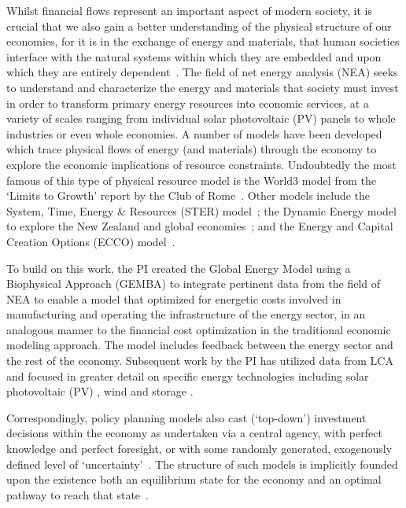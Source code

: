 \documentclass[11pt,a4paper]{article}
\begin{document}
Whilst financial flows represent an important aspect of modern society,
it is crucial that we also gain a better understanding of 
the physical structure of our economies,
for it is in the exchange of energy and materials,
that human societies interface with the natural systems
within which they are embedded and upon which 
they are entirely dependent~\cite{Heun2015, Dale2012a}.
The field of net energy analysis (NEA)
seeks to understand and characterize the 
energy and materials that society must invest
in order to transform primary energy resources into economic services,
at a variety of scales ranging from individual solar photovoltaic (PV) panels 
to whole industries or even whole economies.
A number of models have been developed 
which trace physical flows of energy (and materials) 
through the economy to explore 
the economic implications of resource constraints. 
Undoubtedly the most famous of this type of 
physical resource model is the World3 model from 
the `Limits to Growth' report by the Club of Rome~\cite{Meadows1972}. 
Other models include the System, Time, Energy \& Resources (STER) model~\cite{Hounam1979}; 
the Dynamic Energy model to explore the New Zealand  and global  economies~\cite{Baines1983, Bodger1989}; 
and the Energy and Capital Creation Options (ECCO) model~\cite{Slesser1992}.

To build on this work, the PI created 
the Global Energy Model using a Biophysical Approach (GEMBA) 
to integrate pertinent data from the field of NEA 
to enable a model that optimized for energetic costs involved in 
manufacturing and operating the infrastructure of the energy sector, 
in an analogous manner to the financial cost optimization 
in the traditional economic modeling approach. 
The model includes feedback between the energy sector 
and the rest of the economy. 
Subsequent work by the PI has utilized data from LCA 
and focused in greater detail on specific energy technologies 
including solar photovoltaic (PV) , wind and storage . 

Correspondingly,
policy planning models also cast (`top-down') investment decisions 
within the economy as undertaken via a central agency,
with perfect knowledge and perfect foresight, 
or with some randomly generated, 
exogenously defined level of `uncertainty'~\cite{Hu2010}.
The structure of such models
is implicitly founded upon the existence both 
an equilibrium state for the economy
and an optimal pathway to reach that state~\cite{}.
\end{document}
